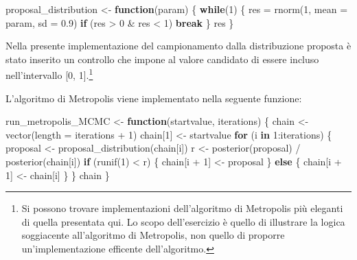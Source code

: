 \documentclass[
]{memoir}
\newenvironment{Shaded}{\begin{snugshade}}{\end{snugshade}}
\newcommand{\AttributeTok}[1]{\textcolor[rgb]{0.77,0.63,0.00}{#1}}
\newcommand{\ControlFlowTok}[1]{\textcolor[rgb]{0.13,0.29,0.53}{\textbf{#1}}}
\newcommand{\DecValTok}[1]{\textcolor[rgb]{0.00,0.00,0.81}{#1}}
\newcommand{\FloatTok}[1]{\textcolor[rgb]{0.00,0.00,0.81}{#1}}
\newcommand{\FunctionTok}[1]{\textcolor[rgb]{0.00,0.00,0.00}{#1}}
\newcommand{\NormalTok}[1]{#1}
\newcommand{\OtherTok}[1]{\textcolor[rgb]{0.56,0.35,0.01}{#1}}
\newcommand{\SpecialCharTok}[1]{\textcolor[rgb]{0.00,0.00,0.00}{#1}}
\begin{document}
\begin{Shaded}
\begin{Highlighting}[]
\NormalTok{proposal\_distribution }\OtherTok{\textless{}{-}} \ControlFlowTok{function}\NormalTok{(param) \{}
  \ControlFlowTok{while}\NormalTok{(}\DecValTok{1}\NormalTok{) \{}
\NormalTok{    res }\OtherTok{=} \FunctionTok{rnorm}\NormalTok{(}\DecValTok{1}\NormalTok{, }\AttributeTok{mean =}\NormalTok{ param, }\AttributeTok{sd =} \FloatTok{0.9}\NormalTok{)}
    \ControlFlowTok{if}\NormalTok{ (res }\SpecialCharTok{\textgreater{}} \DecValTok{0} \SpecialCharTok{\&}\NormalTok{ res }\SpecialCharTok{\textless{}} \DecValTok{1}\NormalTok{)}
      \ControlFlowTok{break}
\NormalTok{  \}}
\NormalTok{  res}
\NormalTok{\}}
\end{Highlighting}
\end{Shaded}

\noindent 
Nella presente implementazione del campionamento dalla distribuzione proposta è stato inserito un controllo che impone al valore candidato di essere incluso nell'intervallo {[}0, 1{]}.\footnote{Si possono trovare implementazioni dell'algoritmo di Metropolis più eleganti di quella presentata qui. Lo scopo dell'esercizio è quello di illustrare la logica soggiacente all'algoritmo di Metropolis, non quello di proporre un'implementazione efficente dell'algoritmo.}

L'algoritmo di Metropolis viene implementato nella seguente funzione:

\begin{Shaded}
\begin{Highlighting}[]
\NormalTok{run\_metropolis\_MCMC }\OtherTok{\textless{}{-}} \ControlFlowTok{function}\NormalTok{(startvalue, iterations) \{}
\NormalTok{  chain }\OtherTok{\textless{}{-}} \FunctionTok{vector}\NormalTok{(}\AttributeTok{length =}\NormalTok{ iterations }\SpecialCharTok{+} \DecValTok{1}\NormalTok{)}
\NormalTok{  chain[}\DecValTok{1}\NormalTok{] }\OtherTok{\textless{}{-}}\NormalTok{ startvalue}
  \ControlFlowTok{for}\NormalTok{ (i }\ControlFlowTok{in} \DecValTok{1}\SpecialCharTok{:}\NormalTok{iterations) \{}
\NormalTok{    proposal }\OtherTok{\textless{}{-}} \FunctionTok{proposal\_distribution}\NormalTok{(chain[i])}
\NormalTok{    r }\OtherTok{\textless{}{-}} \FunctionTok{posterior}\NormalTok{(proposal) }\SpecialCharTok{/} \FunctionTok{posterior}\NormalTok{(chain[i])}
    \ControlFlowTok{if}\NormalTok{ (}\FunctionTok{runif}\NormalTok{(}\DecValTok{1}\NormalTok{) }\SpecialCharTok{\textless{}}\NormalTok{ r) \{}
\NormalTok{      chain[i }\SpecialCharTok{+} \DecValTok{1}\NormalTok{] }\OtherTok{\textless{}{-}}\NormalTok{ proposal}
\NormalTok{    \} }\ControlFlowTok{else}\NormalTok{ \{}
\NormalTok{      chain[i }\SpecialCharTok{+} \DecValTok{1}\NormalTok{] }\OtherTok{\textless{}{-}}\NormalTok{ chain[i]}
\NormalTok{    \}}
\NormalTok{  \}}
\NormalTok{  chain}
\NormalTok{\}}
\end{Highlighting}
\end{Shaded}
\end{document}
